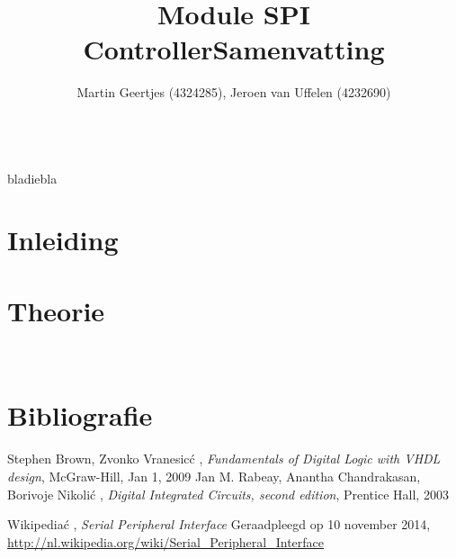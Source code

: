 \documentclass[a4paper, 10 pt]{article}
\title{Module SPI Controller}
\author{Martin Geertjes (4324285), Jeroen van Uffelen (4232690)}
\begin{document}
\maketitle
\newpage
\title{\textbf{Samenvatting}}\\
bladiebla

\newpage

\section{Inleiding}

\section{Theorie}


\
\newpage
\section{Bibliografie}
\begin{thebibliography}{10}
		Stephen Brown, Zvonko Vranesic\'c , 							\emph{Fundamentals of Digital Logic with VHDL design}, McGraw-Hill, Jan 1, 2009	
	\bibitem{ds_book}	Jan M. Rabeay, Anantha Chandrakasan, Borivoje Nikoli\'c , 							\emph{Digital Integrated Circuits, second edition}, Prentice Hall, 2003
	
	Wikipedia\'c , \emph{Serial Peripheral Interface} Geraadpleegd op 10 november 2014, \url{http://nl.wikipedia.org/wiki/Serial_Peripheral_Interface}

\end{thebibliography}




%
\end{document}
